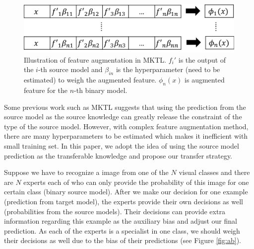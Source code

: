 
\begin{figure}
	\centering
	\includegraphics[scale=0.4]{pakdd/fig/mktl.png}
	\caption{Illustration of feature augmentation in MKTL. $f_i'$ is the output of the $i$-th source model and $\beta_{in}$ is the hyperparameter (need to be estimated) to weigh the augmented feature. $\phi_n(x)$ is augmented feature for the $n$-th binary model.}
	\label{fig:mktl}
\end{figure}
Some previous work such as MKTL\cite{jie2011multiclass} suggests that using the prediction from the source model as the source knowledge can greatly release the constraint of the type of the source model. However, with complex feature augmentation method, there are many hyperparameters to be estimated which makes it inefficient with small training set. In this paper, we adopt the idea of using the source model prediction as the transferable knowledge and propose our transfer strategy.

Suppose we have to recognize a image from one of the $N$ visual classes and there are $N$ experts each of who can only provide the probability of this image for one certain class (binary source model). After we make our decision for one example (prediction from target model), the experts provide their own decisions as well (probabilities from the source models). Their decisions can provide extra information regarding this example as the auxiliary bias and adjust our final prediction.
As each of the experts is a specialist in one class, we should weigh their decisions as well due to the bias of their predictions (see Figure \ref{fig:ab}). 

